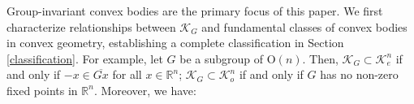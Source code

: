 \documentclass[12pt, reqno]{amsart}
\newtheorem{theorem}{Theorem}[section]
\theoremstyle{definition}
\theoremstyle{remark}
\numberwithin{equation}{section}
\newcommand{\Rn}{\mathbb{R}^{n}}
\newcommand{\On}{\mathrm{O}(n)}
\begin{document}
	   
	   Group-invariant convex bodies are the primary focus of this paper. We first characterize relationships between $\mathcal{K}_G$ and fundamental classes of convex bodies in convex geometry, establishing a complete classification in Section \ref{classification}. For example, 	let $ G $ be a  subgroup of  $ \On $.	Then, $\mathcal{K}_{G} \subset \mathcal{K}^{n}_{e}$ if and only if 	$-x \in \overline{Gx}$ for all $x\in \Rn$; $\mathcal{K}_{G} \subset \mathcal{K}^{n}_{o}$ if and only if $G$ has no non-zero fixed points  in $\Rn$. Moreover, we have:
	   
	   
	   
\end{document}
